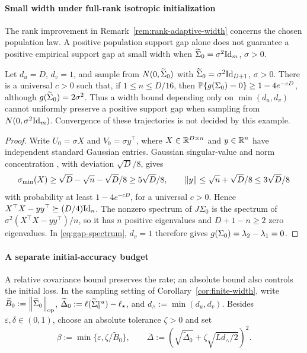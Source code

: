 \paragraph{Small width under full-rank isotropic initialization}
The rank improvement in Remark~\ref{rem:rank-adaptive-width} concerns
the chosen population law. A positive population support gap alone does not
guarantee a positive empirical support gap at small width when
$\widetilde\Sigma_0=\sigma^2\mathrm{Id}_m$, $\sigma>0$.
\begin{example}
\label{ex:white-small-width}
Let $d_u=D$, $d_v=1$, and sample from $N(0,\widetilde\Sigma_0)$ with
$\widetilde\Sigma_0=\sigma^2\mathrm{Id}_{D+1}$, $\sigma>0$.
There is a universal $c>0$ such that, if
$1\le n\le D/16$, then
$\mathbb P\{g(\Sigma_0)=0\}\ge1-4e^{-cD}$,
although $g(\widetilde\Sigma_0)=2\sigma^2$.
Thus a width bound depending only on $\min(d_u,d_v)$ cannot uniformly
preserve a positive support gap when sampling from $N(0,\sigma^2\mathrm{Id}_m)$. Convergence of
these trajectories is not decided by this example.
\end{example}
\begin{proof}
Write $U_0=\sigma X$ and $V_0=\sigma y^\top$, where
$X\in\mathbb{R}^{D\times n}$ and $y\in\mathbb{R}^n$ have independent standard
Gaussian entries. Gaussian singular-value and norm concentration
\citep[Section~7.3]{Vershynin2018}, with deviation $\sqrt D/8$, gives
\[
 \sigma_{\min}(X)\ge\sqrt D-\sqrt n-\sqrt D/8\ge5\sqrt D/8,
 \qquad \left\lVert y \right\rVert\le\sqrt n+\sqrt D/8\le3\sqrt D/8
\]
with probability at least $1-4e^{-cD}$, for a universal $c>0$.
Hence $X^\top X-yy^\top\succeq(D/4)\mathrm{Id}_n$.
The nonzero spectrum of $J\Sigma_0$ is the spectrum of
$\sigma^2(X^\top X-yy^\top)/n$, so it has $n$ positive eigenvalues
and $D+1-n\ge2$ zero eigenvalues. In \eqref{eq:gap-spectrum},
$d_v=1$ therefore gives $g(\Sigma_0)=\lambda_2-\lambda_1=0$.
\end{proof}

\paragraph{A separate initial-accuracy budget}
A relative covariance bound preserves the rate; an absolute bound also
controls the initial loss. In the sampling setting of
Corollary~\ref{cor:finite-width}, write
$\widetilde B_0:=\left\lVert \widetilde\Sigma_0 \right\rVert_{\mathrm{op}}$, $\widetilde\Delta_0:=\ell({\widetilde{\Sigma}}^{vu}_0)-\ell_\star$, and
$d_\wedge:=\min(d_u,d_v)$.
Besides $\varepsilon,\delta\in(0,1)$, choose an absolute tolerance
$\zeta>0$ and set
\begin{equation}\label{eq:sampling-budgets}
 \beta:=\min\{\varepsilon,\zeta/\widetilde B_0\},\qquad
 \overline\Delta:=
 \left(\sqrt{\widetilde\Delta_0}+\zeta\sqrt{Ld_\wedge/2}\right)^2.
\end{equation}

